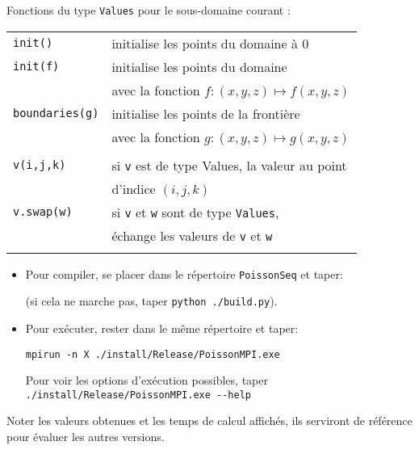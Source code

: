 \documentclass{beamer}
\begin{document}
\begin{frame}
Fonctions du type {\tt Values} pour le sous-domaine courant :
\bigskip

\begin{tabular}{ll}
	{\tt init()} & initialise les points du domaine à 0 \\
	{\tt init(f)}& initialise les points du domaine \\ & avec la fonction $f : (x,y,z) \mapsto f(x,y,z)$\\
	{\tt boundaries(g)} & initialise les points de la frontière \\ &  avec la fonction $g: (x,y,z) \mapsto g(x,y,z)$\\ \\
	{\tt v(i,j,k)}& si {\tt v} est de type {Values}, la valeur au point \\ &  d'indice $(i,j,k)$ \\
	{\tt v.swap(w)} & si {\tt v} et {\tt w} sont de type {\tt Values}, \\ & échange les valeurs de {\tt v} et {\tt w} \\ \\
\end{tabular}

\end{frame}

\begin{frame}[fragile]
\vfill

	
\begin{itemize}
\item 	Pour compiler, se placer dans le répertoire {\tt PoissonSeq} et taper:

		
\vfill
		(si cela ne marche pas, taper \verb|python ./build.py|).
		
\vfill
	\item Pour exécuter, rester dans le même répertoire et taper:

\hspace{2cm}
{\color{blue}\begin{verbatim}
mpirun -n X ./install/Release/PoissonMPI.exe
\end{verbatim}
}

\vfill
Pour voir les options d'exécution possibles, taper \verb|./install/Release/PoissonMPI.exe --help|
\end{itemize}

\vfill
Noter les valeurs obtenues et les temps de calcul affichés, ils serviront de référence pour évaluer les autres versions. 
\vfill
\end{frame}
\end{document}
